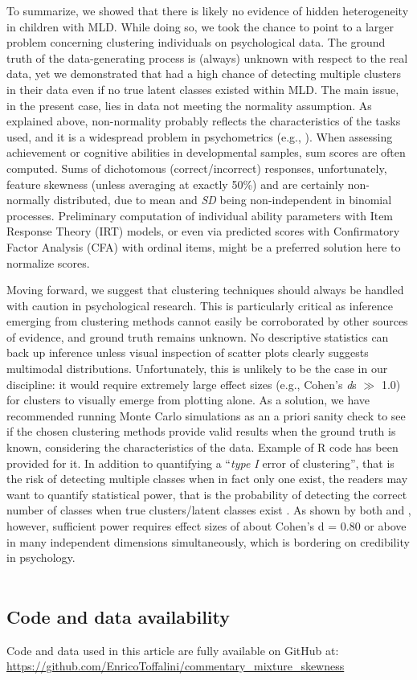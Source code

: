 \documentclass[letterpaper,11pt]{article}
\begin{document}
To summarize, we showed that there is likely no evidence of hidden heterogeneity in children with MLD. While doing so, we took the chance to point to a larger problem concerning clustering individuals on psychological data. The ground truth of the data-generating process is (always) unknown with respect to the real data, yet we demonstrated that  had a high chance of detecting multiple clusters in their data even if no true latent classes existed within MLD. The main issue, in the present case, lies in data not meeting the normality assumption. As explained above, non-normality probably reflects the characteristics of the tasks used, and it is a widespread problem in psychometrics (e.g., ). When assessing achievement or cognitive abilities in developmental samples, sum scores are often computed. Sums of dichotomous (correct/incorrect) responses, unfortunately, feature skewness (unless averaging at exactly 50\%) and are certainly non-normally distributed, due to mean and \textit{SD} being non-independent in binomial processes. Preliminary computation of individual ability parameters with Item Response Theory (IRT) models, or even via predicted scores with Confirmatory Factor Analysis (CFA) with ordinal items, might be a preferred solution here to normalize scores.

Moving forward, we suggest that clustering techniques should always be handled with caution in psychological research. This is particularly critical as inference emerging from clustering methods cannot easily be corroborated by other sources of evidence, and ground truth remains unknown. No descriptive statistics can back up inference unless visual inspection of scatter plots clearly suggests multimodal distributions. Unfortunately, this is unlikely to be the case in our discipline: it would require extremely large effect sizes (e.g., Cohen’s \textit{d}s $\gg$ 1.0) for clusters to visually emerge from plotting alone. As a solution, we have recommended running Monte Carlo simulations as an a priori sanity check to see if the chosen clustering methods provide valid results when the ground truth is known, considering the characteristics of the data. Example of R code has been provided for it. In addition to quantifying a “\textit{type I} error of clustering”, that is the risk of detecting multiple classes when in fact only one exist, the readers may want to quantify statistical power, that is the probability of detecting the correct number of classes when true clusters/latent classes exist \cite{tein2013statistical}. As shown by both  and , however, sufficient power requires effect sizes of about Cohen’s d = 0.80 or above in many independent dimensions simultaneously, which is bordering on credibility in psychology.
\\
\\
\subsection*{Code and data availability }
Code and data used in this article are fully available on GitHub at: \url{https://github.com/EnricoToffalini/commentary_mixture_skewness}
\newpage


\end{document}
